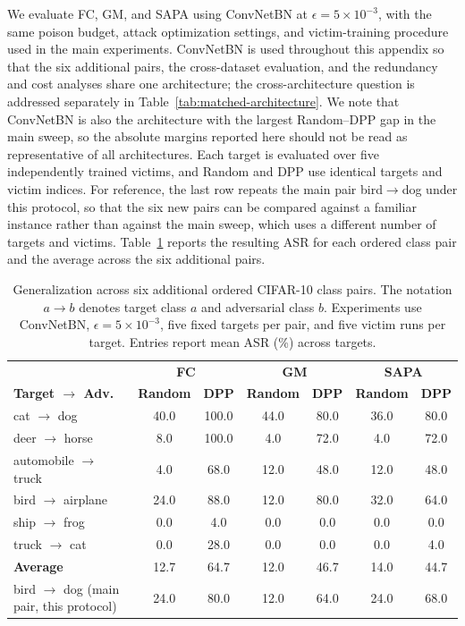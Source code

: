 We evaluate FC, GM, and SAPA using ConvNetBN at
$\epsilon=5\times10^{-3}$, with the same poison budget, attack
optimization settings, and victim-training procedure used in the main
experiments. ConvNetBN is used throughout this appendix so that the six
additional pairs, the cross-dataset evaluation, and the redundancy and
cost analyses share one architecture; the cross-architecture question is
addressed separately in Table~\ref{tab:matched-architecture}. We note
that ConvNetBN is also the architecture with the largest Random--DPP gap
in the main sweep, so the absolute margins reported here should not be
read as representative of all architectures. Each target is evaluated
over five independently trained victims, and Random and DPP use identical
targets and victim indices. For reference, the last row repeats the main
pair bird$\rightarrow$dog under this protocol, so that the six new pairs
can be compared against a familiar instance rather than against the
main sweep, which uses a different number of targets and victims.
Table~\ref{tab:broad-cifar} reports the resulting ASR for each ordered
class pair and the average across the six additional pairs.





\begin{table}[t]
\centering
\caption{
Generalization across six additional ordered CIFAR-10 class pairs.
The notation $a\!\rightarrow\!b$ denotes target class $a$ and
adversarial class $b$. Experiments use ConvNetBN,
$\epsilon=5\times10^{-3}$, five fixed targets per pair, and five victim
runs per target. Entries report mean ASR (\%) across targets.
}
\label{tab:broad-cifar}
\small
\setlength{\tabcolsep}{4.8pt}
\renewcommand{\arraystretch}{1.08}
\begin{tabular}{l|cc|cc|cc}
\toprule
&
\multicolumn{2}{c|}{\textbf{FC}} &
\multicolumn{2}{c|}{\textbf{GM}} &
\multicolumn{2}{c}{\textbf{SAPA}} \\
\textbf{Target $\rightarrow$ Adv.} &
\textbf{Random} & \textbf{DPP} &
\textbf{Random} & \textbf{DPP} &
\textbf{Random} & \textbf{DPP} \\
\midrule
cat $\rightarrow$ dog
    & 40.0 & 100.0 & 44.0 & 80.0 & 36.0 & 80.0 \\
deer $\rightarrow$ horse
    & 8.0 & 100.0 & 4.0 & 72.0 & 4.0 & 72.0 \\
automobile $\rightarrow$ truck
    & 4.0 & 68.0 & 12.0 & 48.0 & 12.0 & 48.0 \\
bird $\rightarrow$ airplane
    & 24.0 & 88.0 & 12.0 & 80.0 & 32.0 & 64.0 \\
ship $\rightarrow$ frog
    & 0.0 & 4.0 & 0.0 & 0.0 & 0.0 & 0.0 \\
truck $\rightarrow$ cat
    & 0.0 & 28.0 & 0.0 & 0.0 & 0.0 & 4.0 \\
\midrule
\textbf{Average}
    & 12.7 & 64.7 & 12.0 & 46.7 & 14.0 & 44.7 \\
\midrule
bird $\rightarrow$ dog \small{(main pair, this protocol)}
    & 24.0 & 80.0 & 12.0 & 64.0 & 24.0 & 68.0 \\
\bottomrule
\end{tabular}
\end{table}


